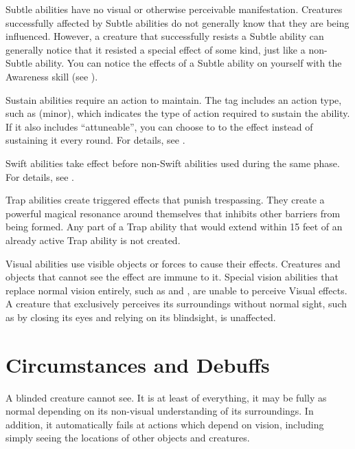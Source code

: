      Subtle abilities have no visual or otherwise perceivable manifestation.
    Creatures successfully affected by Subtle abilities do not generally know that they are being influenced.
    However, a creature that successfully resists a Subtle ability can generally notice that it resisted a special effect of some kind, just like a non-Subtle ability.
    You can notice the effects of a Subtle ability on yourself with the Awareness skill (see ).

     Sustain abilities require an action to maintain.
    The tag includes an action type, such as (minor), which indicates the type of action required to sustain the ability.
    If it also includes ``attuneable'', you can choose to  to the effect instead of sustaining it every round.
    For details, see .

     Swift abilities take effect before non-Swift abilities used during the same phase.
    For details, see .

     Trap abilities create triggered effects that punish trespassing.
    They create a powerful magical resonance around themselves that inhibits other barriers from being formed.
    Any part of a Trap ability that would extend within 15 feet of an already active Trap ability is not created.

     Visual abilities use visible objects or forces to cause their effects.
    Creatures and objects that cannot see the effect are immune to it.
    Special vision abilities that replace normal vision entirely, such as  and , are unable to perceive Visual effects.
    A creature that exclusively perceives its surroundings without normal sight, such as by closing its eyes and relying on its blindsight, is unaffected.

\newpage
\section{Circumstances and Debuffs}\label{Circumstances and Debuffs}

     A blinded creature cannot see.
    It is at least \partiallyunaware of everything, it may be fully \unaware as normal depending on its non-visual understanding of its surroundings.
    In addition, it automatically fails at actions which depend on vision, including simply seeing the locations of other objects and creatures.

